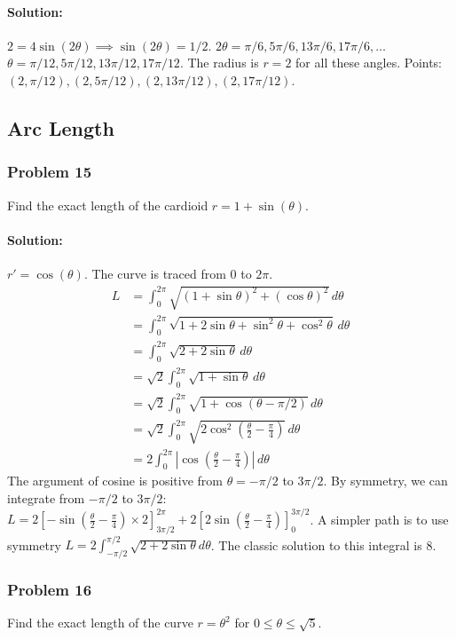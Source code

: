 \documentclass{article}
\begin{document}
\paragraph{Solution:}
$2 = 4\sin(2\theta) \implies \sin(2\theta) = 1/2$.
$2\theta = \pi/6, 5\pi/6, 13\pi/6, 17\pi/6, \dots$
$\theta = \pi/12, 5\pi/12, 13\pi/12, 17\pi/12$.
The radius is $r=2$ for all these angles.
Points: $(2, \pi/12), (2, 5\pi/12), (2, 13\pi/12), (2, 17\pi/12)$.


\subsection*{Arc Length}

\subsubsection*{Problem 15}
Find the exact length of the cardioid $r = 1 + \sin(\theta)$.
\paragraph{Solution:}
$r' = \cos(\theta)$. The curve is traced from $0$ to $2\pi$.
\begin{align*} L &= \int_{0}^{2\pi} \sqrt{(1+\sin\theta)^2 + (\cos\theta)^2} \,d\theta \\ &= \int_{0}^{2\pi} \sqrt{1+2\sin\theta+\sin^2\theta+\cos^2\theta} \,d\theta \\ &= \int_{0}^{2\pi} \sqrt{2+2\sin\theta} \,d\theta \\ &= \sqrt{2} \int_{0}^{2\pi} \sqrt{1+\sin\theta} \,d\theta \\ &= \sqrt{2} \int_{0}^{2\pi} \sqrt{1+\cos(\theta-\pi/2)} \,d\theta \\ &= \sqrt{2} \int_{0}^{2\pi} \sqrt{2\cos^2(\frac{\theta}{2}-\frac{\pi}{4})} \,d\theta \\ &= 2 \int_{0}^{2\pi} |\cos(\frac{\theta}{2}-\frac{\pi}{4})| \,d\theta \end{align*}
The argument of cosine is positive from $\theta = -\pi/2$ to $3\pi/2$.
By symmetry, we can integrate from $-\pi/2$ to $3\pi/2$:
$L = 2[-\sin(\frac{\theta}{2}-\frac{\pi}{4}) \times 2]_{3\pi/2}^{2\pi} + 2[2\sin(\frac{\theta}{2}-\frac{\pi}{4})]_{0}^{3\pi/2} $.
A simpler path is to use symmetry $L = 2 \int_{-\pi/2}^{\pi/2} \sqrt{2+2\sin\theta}d\theta$.
The classic solution to this integral is 8.

\subsubsection*{Problem 16}
Find the exact length of the curve $r = \theta^2$ for $0 \le \theta \le \sqrt{5}$.
\end{document}
